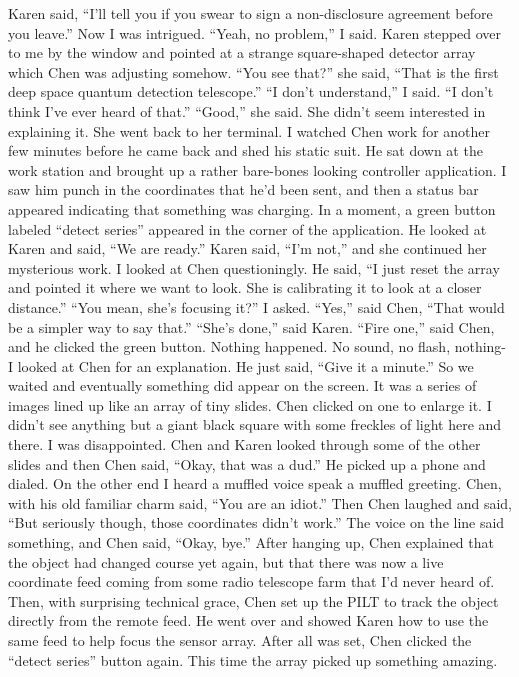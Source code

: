 \documentclass[a4paper]{article}
\begin{document}
Karen said, “I’ll tell you if you swear to sign a non-disclosure agreement before you leave.”
Now I was intrigued. “Yeah, no problem,” I said.
Karen stepped over to me by the window and pointed at a strange square-shaped detector array which Chen was adjusting somehow. “You see that?” she said, “That is the first deep space quantum detection telescope.”
“I don’t understand,” I said. “I don’t think I’ve ever heard of that.”
“Good,” she said. She didn’t seem interested in explaining it. She went back to her terminal.
I watched Chen work for another few minutes before he came back and shed his static suit. He sat down at the work station and brought up a rather bare-bones looking controller application. I saw him punch in the coordinates that he’d been sent, and then a status bar appeared indicating that something was charging.
In a moment, a green button labeled “detect series” appeared in the corner of the application. He looked at Karen and said, “We are ready.”
Karen said, “I’m not,” and she continued her mysterious work.
I looked at Chen questioningly. He said, “I just reset the array and pointed it where we want to look. She is calibrating it to look at a closer distance.”
“You mean, she’s focusing it?” I asked.
“Yes,” said Chen, “That would be a simpler way to say that.”
“She’s done,” said Karen.
“Fire one,” said Chen, and he clicked the green button.
Nothing happened. No sound, no flash, nothing- I looked at Chen for an explanation. He just said, “Give it a minute.”
So we waited and eventually something did appear on the screen. It was a series of images lined up like an array of tiny slides. Chen clicked on one to enlarge it. I didn’t see anything but a giant black square with some freckles of light here and there. I was disappointed.
Chen and Karen looked through some of the other slides and then Chen said, “Okay, that was a dud.”
He picked up a phone and dialed. On the other end I heard a muffled voice speak a muffled greeting. Chen, with his old familiar charm said, “You are an idiot.”
Then Chen laughed and said, “But seriously though, those coordinates didn’t work.”
The voice on the line said something, and Chen said, “Okay, bye.”
After hanging up, Chen explained that the object had changed course yet again, but that there was now a live coordinate feed coming from some radio telescope farm that I’d never heard of. Then, with surprising technical grace, Chen set up the PILT to track the object directly from the remote feed. He went over and showed Karen how to use the same feed to help focus the sensor array.
After all was set, Chen clicked the “detect series” button again. This time the array picked up something amazing.
\end{document}
